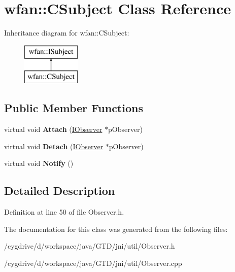 \hypertarget{classwfan_1_1CSubject}{\section{wfan\-:\-:C\-Subject Class Reference}
\label{classwfan_1_1CSubject}
}
Inheritance diagram for wfan\-:\-:C\-Subject\-:\begin{figure}[H]
\begin{center}
\leavevmode
\includegraphics[height=2.000000cm]{classwfan_1_1CSubject}
\end{center}
\end{figure}
\subsection*{Public Member Functions}
\begin{DoxyCompactItemize}
\item 
\hypertarget{classwfan_1_1CSubject_add6003a736e35f618c8d8777cfdaab0b}{virtual void {\bfseries Attach} (\hyperlink{classwfan_1_1IObserver}{I\-Observer} $\ast$p\-Observer)}\label{classwfan_1_1CSubject_add6003a736e35f618c8d8777cfdaab0b}

\item 
\hypertarget{classwfan_1_1CSubject_a1f37b4c07b0321e4bf0272cea120ca6f}{virtual void {\bfseries Detach} (\hyperlink{classwfan_1_1IObserver}{I\-Observer} $\ast$p\-Observer)}\label{classwfan_1_1CSubject_a1f37b4c07b0321e4bf0272cea120ca6f}

\item 
\hypertarget{classwfan_1_1CSubject_a4bd9c19bf9af8d0f49b88f969b185ad5}{virtual void {\bfseries Notify} ()}\label{classwfan_1_1CSubject_a4bd9c19bf9af8d0f49b88f969b185ad5}

\end{DoxyCompactItemize}


\subsection{Detailed Description}


Definition at line 50 of file Observer.\-h.



The documentation for this class was generated from the following files\-:\begin{DoxyCompactItemize}
\item 
/cygdrive/d/workspace/java/\-G\-T\-D/jni/util/Observer.\-h\item 
/cygdrive/d/workspace/java/\-G\-T\-D/jni/util/Observer.\-cpp\end{DoxyCompactItemize}

